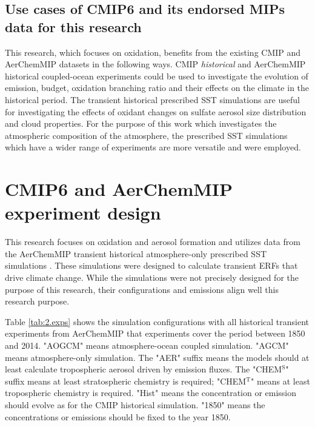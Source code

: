 \subsection{Use cases of CMIP6 and its endorsed MIPs data for this research}

This research, which focuses on  oxidation, benefits from the existing CMIP and AerChemMIP datasets in the following ways. CMIP \textit{historical} and AerChemMIP historical coupled-ocean experiments could be used to investigate the evolution of  emission, budget, oxidation branching ratio and their effects on the climate in the historical period. The transient historical prescribed SST simulations are useful for investigating the effects of oxidant changes on sulfate aerosol size distribution and cloud properties.  For the purpose of this work which investigates the atmospheric composition of the atmosphere, the prescribed SST simulations which have a wider range of experiments are more versatile and were employed.



\section{CMIP6 and AerChemMIP experiment design}

This research focuses on  oxidation and aerosol formation and utilizes data from the AerChemMIP transient historical atmosphere-only prescribed SST simulations \citep{collinsAerChemMIPQuantifyingEffects2017}. These simulations were designed to calculate transient ERFs that drive climate change.  While the simulations were not precisely designed for the purpose of this research, their configurations and emissions align well this research purpose.


Table \ref{tab:2.exps} shows the simulation configurations with all historical transient experiments from AerChemMIP that experiments cover the period between 1850 and 2014. "AOGCM" means atmosphere-ocean coupled simulation. "AGCM" means atmosphere-only simulation. The "AER" suffix means the models should at least calculate tropospheric aerosol driven by emission fluxes. The "CHEM$^\text{S}$" suffix means at least stratospheric chemistry is required; "CHEM$^\text{T}$" means at least tropospheric chemistry is required. "Hist" means the concentration or emission should evolve as for the CMIP historical simulation. "1850" means the concentrations or emissions should be fixed to the year 1850. 

